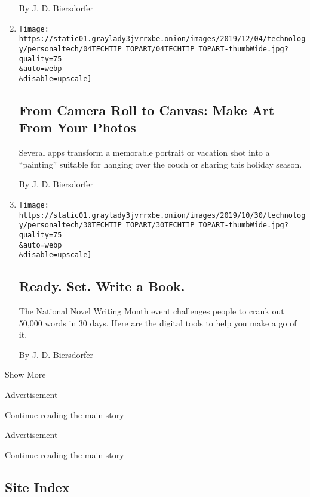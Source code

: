 \begin{enumerate}
  By J. D. Biersdorfer
\item
  \href{/2019/12/04/technology/personaltech/turn-photos-into-paintings.html}{}

  \texttt{[image: https://static01.graylady3jvrrxbe.onion/images/2019/12/04/technology/personaltech/04TECHTIP\_TOPART/04TECHTIP\_TOPART-thumbWide.jpg?quality=75\\\&auto=webp\\\&disable=upscale]}

  \hypertarget{from-camera-roll-to-canvas-make-art-from-your-photos}{%
  \subsection{From Camera Roll to Canvas: Make Art From Your
  Photos}\label{from-camera-roll-to-canvas-make-art-from-your-photos}}

  Several apps transform a memorable portrait or vacation shot into a
  ``painting'' suitable for hanging over the couch or sharing this
  holiday season.

  By J. D. Biersdorfer
\item
  \href{/2019/10/30/technology/personaltech/national-novel-writing-month-apps-tools.html}{}

  \texttt{[image: https://static01.graylady3jvrrxbe.onion/images/2019/10/30/technology/personaltech/30TECHTIP\_TOPART/30TECHTIP\_TOPART-thumbWide.jpg?quality=75\\\&auto=webp\\\&disable=upscale]}

  \hypertarget{ready-set-write-a-book}{%
  \subsection{Ready. Set. Write a Book.}\label{ready-set-write-a-book}}

  The National Novel Writing Month event challenges people to crank out
  50,000 words in 30 days. Here are the digital tools to help you make a
  go of it.

  By J. D. Biersdorfer
\end{enumerate}

Show More

Advertisement

\protect\hyperlink{after-mid1}{Continue reading the main story}

Advertisement

\protect\hyperlink{after-mktg}{Continue reading the main story}

\hypertarget{site-index}{%
\subsection{Site Index}\label{site-index}}

